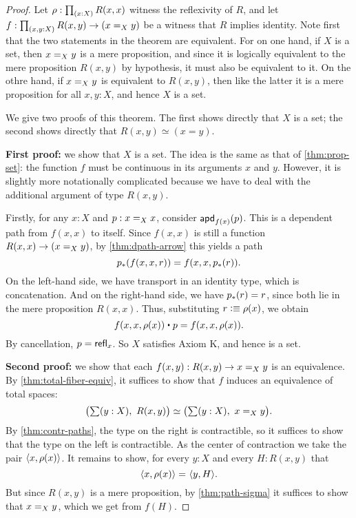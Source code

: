 \begin{proof}
  Let $\rho : \prd{x:X} R(x,x)$ witness the reflexivity of $R$, and let $f : \prd{x,y:X} R(x,y) \to (\id[X]{x}{y})$ be a witness that $R$
implies identity.
  Note first that the two statements in the theorem are equivalent.
  For on one hand, if $X$ is a set, then $\id[X]xy$ is a mere proposition, and since it is logically equivalent to the mere proposition
$R(x,y)$ by hypothesis, it must also be equivalent to it.
  On the othre hand, if $\id[X]xy$ is equivalent to $R(x,y)$, then like the latter it is a mere proposition for all $x,y:X$, and hence $X$
is a set.

  We give two proofs of this theorem.
  The first shows directly that $X$ is a set; the second shows directly that $R(x,y)\simeq (x=y)$.

  \textbf{First proof:} we show that $X$ is a set.
  The idea is the same as that of \autoref{thm:prop-set}: the function $f$ must be continuous in its arguments $x$ and $y$.
  However, it is slightly more notationally complicated because we have to deal with the additional argument of type $R(x,y)$.

  Firstly, for any $x:X$ and $p:\id[X]xx$, consider $\apdfunc{f(x)}(p)$.
  This is a dependent path from $f(x,x)$ to itself.
  Since $f(x,x)$ is still a function $R(x,x) \to (\id[X]xy)$, by \autoref{thm:dpath-arrow} this yields a path
  \[\trans{p}{f(x,x,r)} = f(x,x,\trans{p}r).
  \]
  On the left-hand side, we have transport in an identity type, which is concatenation.
  And on the right-hand side, we have $\trans{p}r = r$, since both lie in the mere proposition $R(x,x)$.
  Thus, substituting $r\defeq \rho(x)$, we obtain
  \[ f(x,x,\rho(x)) \ct p = f(x,x,\rho(x)). \]
  By cancellation, $p=\refl{x}$.
  So $X$ satisfies Axiom K, and hence is a set.

  \textbf{Second proof:} we show that each $f(x,y) : R(x,y) \to \id[X]{x}{y}$ is an equivalence.
  By \autoref{thm:total-fiber-equiv}, it suffices to show that $f$ induces an equivalence of total spaces:
  \begin{equation*}
    \eqv{\big(\sm{y:X}R(x,y)\big)}{\big(\sm{y:X}\id[X]{x}{y}\big)}.
  \end{equation*}
  By \autoref{thm:contr-paths}, the type on the right is contractible, so it
  suffices to show that the type on the left is contractible. As the center of
  contraction we take the pair $\pairr{x,\rho(x)}$.  It remains to show, for
  every ${y:X}$ and every ${H:R(x,y)}$ that
  \begin{equation*}
    \id{\pairr{x,\rho(x)}}{\pairr{y,H}}.
  \end{equation*}
  But since $R(x,y)$ is a mere proposition, by \autoref{thm:path-sigma} it suffices to show that
  $\id[X]{x}{y}$, which we get from $f(H)$.
\end{proof}

